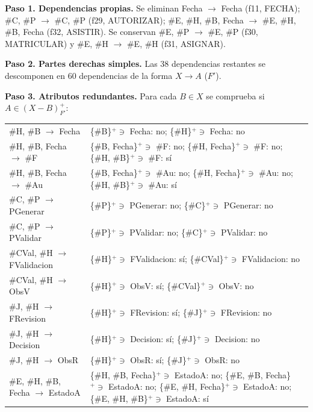 \textbf{Paso 1. Dependencias propias.} Se eliminan Fecha \ensuremath{\to} Fecha (f11, FECHA); \#C, \#P \ensuremath{\to} \#C, \#P (f29, AUTORIZAR); \#E, \#H, \#B, Fecha \ensuremath{\to} \#E, \#H, \#B, Fecha (f32, ASISTIR). Se conservan \#E, \#P \ensuremath{\to} \#E, \#P (f30, MATRICULAR) y \#E, \#H \ensuremath{\to} \#E, \#H (f31, ASIGNAR).

\textbf{Paso 2. Partes derechas simples.} Las 38 dependencias restantes se descomponen en 60 dependencias de la forma $X \to A$ ($F'$).

\textbf{Paso 3. Atributos redundantes.} Para cada $B \in X$ se comprueba si $A \in (X - B)^+_{F'}$:

{\footnotesize\filas
\begin{xltabular}{\linewidth}{L{0.7}L{1.3}}
 &  \\
\endhead
\#H, \#B \ensuremath{\to} Fecha & \{\#B\}$^+ \ni$ Fecha: no; \{\#H\}$^+ \ni$ Fecha: no \\
\#H, \#B, Fecha \ensuremath{\to} \#F & \{\#B, Fecha\}$^+ \ni$ \#F: no; \{\#H, Fecha\}$^+ \ni$ \#F: no; \{\#H, \#B\}$^+ \ni$ \#F: sí \\
\#H, \#B, Fecha \ensuremath{\to} \#Au & \{\#B, Fecha\}$^+ \ni$ \#Au: no; \{\#H, Fecha\}$^+ \ni$ \#Au: no; \{\#H, \#B\}$^+ \ni$ \#Au: sí \\
\#C, \#P \ensuremath{\to} PGenerar & \{\#P\}$^+ \ni$ PGenerar: no; \{\#C\}$^+ \ni$ PGenerar: no \\
\#C, \#P \ensuremath{\to} PValidar & \{\#P\}$^+ \ni$ PValidar: no; \{\#C\}$^+ \ni$ PValidar: no \\
\#CVal, \#H \ensuremath{\to} FValidacion & \{\#H\}$^+ \ni$ FValidacion: sí; \{\#CVal\}$^+ \ni$ FValidacion: no \\
\#CVal, \#H \ensuremath{\to} ObsV & \{\#H\}$^+ \ni$ ObsV: sí; \{\#CVal\}$^+ \ni$ ObsV: no \\
\#J, \#H \ensuremath{\to} FRevision & \{\#H\}$^+ \ni$ FRevision: sí; \{\#J\}$^+ \ni$ FRevision: no \\
\#J, \#H \ensuremath{\to} Decision & \{\#H\}$^+ \ni$ Decision: sí; \{\#J\}$^+ \ni$ Decision: no \\
\#J, \#H \ensuremath{\to} ObsR & \{\#H\}$^+ \ni$ ObsR: sí; \{\#J\}$^+ \ni$ ObsR: no \\
\#E, \#H, \#B, Fecha \ensuremath{\to} EstadoA & \{\#H, \#B, Fecha\}$^+ \ni$ EstadoA: no; \{\#E, \#B, Fecha\}$^+ \ni$ EstadoA: no; \{\#E, \#H, Fecha\}$^+ \ni$ EstadoA: no; \{\#E, \#H, \#B\}$^+ \ni$ EstadoA: sí \\

\end{xltabular}}

